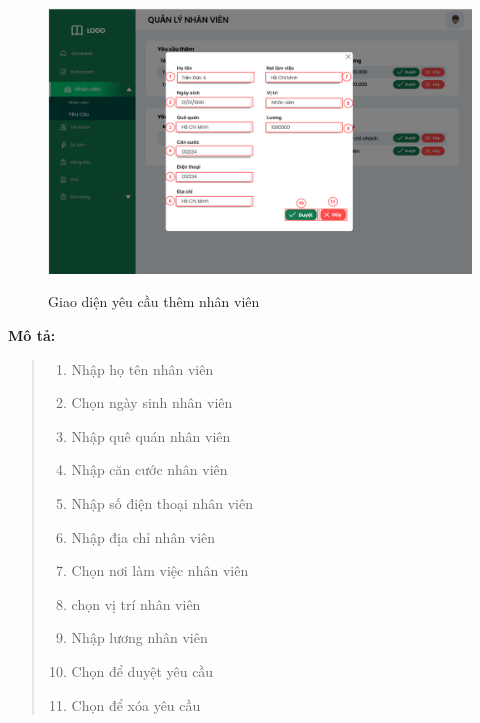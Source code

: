             \begin{figure}[!htp]
                \centering
                \includegraphics[width=12cm]{img/UI/admin/staff_request_add.png}
                \label{27}
                \newline
                \caption{Giao diện yêu cầu thêm nhân viên}
            \end{figure}
            \textbf{Mô tả:}  
            \begin{quote}
                \begin{enumerate}
                    \item Nhập họ tên nhân viên
                    \item Chọn ngày sinh nhân viên
                    \item Nhập quê quán nhân viên
                    \item Nhập căn cước nhân viên
                    \item Nhập số điện thoại nhân viên
                    \item Nhập địa chỉ nhân viên
                    \item Chọn nơi làm việc nhân viên
                    \item chọn vị trí nhân viên
                    \item Nhập lương nhân viên
                    \item Chọn để duyệt yêu cầu
                    \item Chọn để xóa yêu cầu
                \end{enumerate}
            \end{quote}
        
